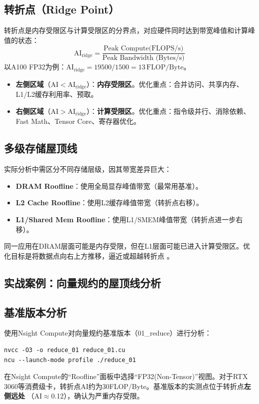 \subsection{转折点（Ridge Point）}
转折点是内存受限区与计算受限区的分界点，对应硬件同时达到带宽峰值和计算峰值的状态：
\begin{equation}
    \text{AI}_{\text{ridge}} = \frac
{\text{Peak Compute(FLOPS/s)}}
{\text{Peak Bandwidth (Bytes/s)}}
\end{equation}
以A100 FP32为例：$\text{AI}_{\text{ridge}} = 19500 / 1500 =1
3\,\text{FLOP/Byte}$。
\begin{itemize}
    \item \textbf{左侧区域}（$\text{AI} < \text{AI}_{\text{ridge}}$）：\textbf{内存受限区}。优化重点：合并访问、共享内存、L1/L2缓存利用率、预取。
    \item \textbf{右侧区域}（$\text{AI} > \text{AI}_{\text{ridge}}$）：\textbf{计算受限区}。优化重点：指令级并行、消除依赖、Fast Math、Tensor Core、寄存器优化。
\end{itemize}

\subsection{多级存储屋顶线}
实际分析中需区分不同存储层级，因其带宽差异巨大：
\begin{itemize}
    \item \textbf{DRAM Roofline}：使用全局显存峰值带宽（最常用基准）。
    \item \textbf{L2 Cache Roofline}：使用L2缓存峰值带宽（转折点右移）。
    \item \textbf{L1/Shared Mem Roofline}：使用L1/SMEM峰值带宽（转折点进一步右移）。
\end{itemize}
同一应用在DRAM层面可能是内存受限，但在L1层面可能已进入计算受限区。优化目标是将数据点向右上方推移，逼近或超越转折点
。

\subsection{实战案例：向量规约的屋顶线分析}

\subsection{基准版本分析}
使用Nsight Compute对向量规约基准版本（01\_reduce）进行分析：
\begin{lstlisting}
nvcc -O3 -o reduce_01 reduce_01.cu
ncu --launch-mode profile ./reduce_01
\end{lstlisting}
在Nsight Compute的``Roofline''面板中选择``FP32(Non-Tensor)''视图。对于RTX 3060等消费级卡，转折点AI约为30FLOP/Byte。基准版本的实测点位于转折点\textbf{左侧远处}
（AI$\approx$0.12），确认为严重内存受限。
